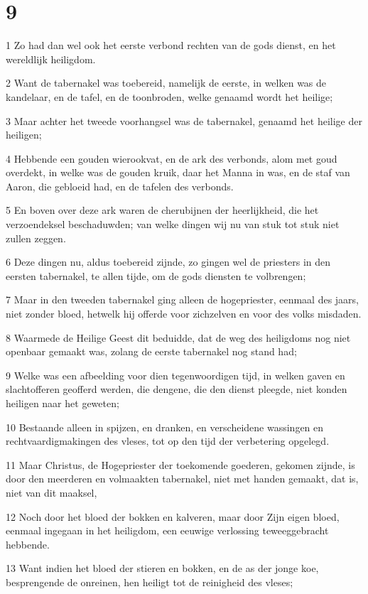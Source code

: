 \chapter{9}

\par 1 Zo had dan wel ook het eerste verbond rechten van de gods dienst, en het wereldlijk heiligdom.
\par 2 Want de tabernakel was toebereid, namelijk de eerste, in welken was de kandelaar, en de tafel, en de toonbroden, welke genaamd wordt het heilige;
\par 3 Maar achter het tweede voorhangsel was de tabernakel, genaamd het heilige der heiligen;
\par 4 Hebbende een gouden wierookvat, en de ark des verbonds, alom met goud overdekt, in welke was de gouden kruik, daar het Manna in was, en de staf van Aaron, die gebloeid had, en de tafelen des verbonds.
\par 5 En boven over deze ark waren de cherubijnen der heerlijkheid, die het verzoendeksel beschaduwden; van welke dingen wij nu van stuk tot stuk niet zullen zeggen.
\par 6 Deze dingen nu, aldus toebereid zijnde, zo gingen wel de priesters in den eersten tabernakel, te allen tijde, om de gods diensten te volbrengen;
\par 7 Maar in den tweeden tabernakel ging alleen de hogepriester, eenmaal des jaars, niet zonder bloed, hetwelk hij offerde voor zichzelven en voor des volks misdaden.
\par 8 Waarmede de Heilige Geest dit beduidde, dat de weg des heiligdoms nog niet openbaar gemaakt was, zolang de eerste tabernakel nog stand had;
\par 9 Welke was een afbeelding voor dien tegenwoordigen tijd, in welken gaven en slachtofferen geofferd werden, die dengene, die den dienst pleegde, niet konden heiligen naar het geweten;
\par 10 Bestaande alleen in spijzen, en dranken, en verscheidene wassingen en rechtvaardigmakingen des vleses, tot op den tijd der verbetering opgelegd.
\par 11 Maar Christus, de Hogepriester der toekomende goederen, gekomen zijnde, is door den meerderen en volmaakten tabernakel, niet met handen gemaakt, dat is, niet van dit maaksel,
\par 12 Noch door het bloed der bokken en kalveren, maar door Zijn eigen bloed, eenmaal ingegaan in het heiligdom, een eeuwige verlossing teweeggebracht hebbende.
\par 13 Want indien het bloed der stieren en bokken, en de as der jonge koe, besprengende de onreinen, hen heiligt tot de reinigheid des vleses;
